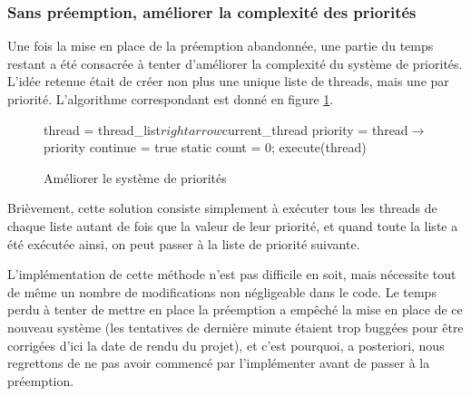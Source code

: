 \documentclass[a4paper,11pt]{article}
\begin{document}
\subsubsection*{Sans préemption, améliorer la complexité des priorités}

Une fois la mise en place de la préemption abandonnée, une partie du temps restant a été consacrée à tenter d'améliorer la complexité du système de priorités. L'idée retenue était de créer non plus une unique liste de threads, mais une par priorité. L'algorithme correspondant est donné en figure \ref{priority3}.

\begin{figure}[H]
\begin{algorithm}[H]
 thread = thread\_list$rightarrow$current\_thread\;
 priority = thread$\rightarrow$priority\;
 continue = true\;
 static count = 0;
 \BlankLine
 execute(thread)\;
\end{algorithm}
\caption{Améliorer le système de priorités}
\label{priority3}
\end{figure}

Brièvement, cette solution consiste simplement à exécuter tous les threads de chaque liste autant de fois que la valeur de leur priorité, et quand toute la liste a été exécutée ainsi, on peut passer à la liste de priorité suivante.

L'implémentation de cette méthode n'est pas difficile en soit, mais nécessite tout de même un nombre de modifications non négligeable dans le code. Le temps perdu à tenter de mettre en place la préemption a empêché la mise en place de ce nouveau système (les tentatives de dernière minute étaient trop buggées pour être corrigées d'ici la date de rendu du projet), et c'est pourquoi, a posteriori, nous regrettons de ne pas avoir commencé par l'implémenter avant de passer à la préemption.
\end{document}
